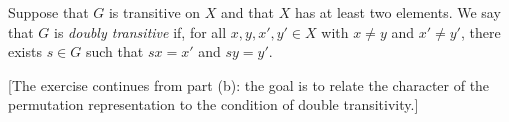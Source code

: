 Suppose that $G$ is transitive on $X$ and that $X$ has at least two elements. We say that $G$ is \emph{doubly transitive} if, for all $x, y, x', y' \in X$ with $x \neq y$ and $x' \neq y'$, there exists $s \in G$ such that $s x = x'$ and $s y = y'$.

[The exercise continues from part (b): the goal is to relate the character of the permutation representation to the condition of double transitivity.]